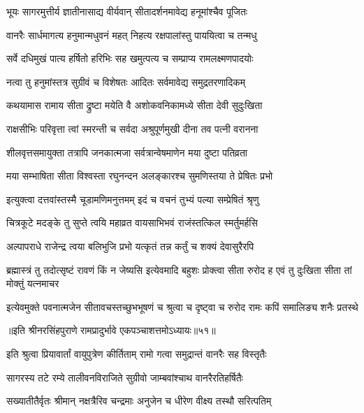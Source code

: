 \twolineshloka
{भूयः सागरमुत्तीर्य ज्ञातीनासाद्य वीर्यवान्}
{सीतादर्शनमावेद्य हनूमांश्चैव पूजितः} %

\twolineshloka
{वानरैः सार्धमागत्य हनुमान्मधुवनं महत्}
{निहत्य रक्षपालांस्तु पाययित्वा च तन्मधु} %

\twolineshloka
{सर्वे दधिमुखं पात्य हर्षितो हरिभिः सह}
{खमुत्पत्य च सम्प्राप्य रामलक्ष्मणपादयोः} %

\twolineshloka
{नत्वा तु हनुमांस्तत्र सुग्रीवं च विशेषतः}
{आदितः सर्वमावेद्य समुद्रतरणादिकम्} %

\twolineshloka
{कथयामास रामाय सीता द्रुष्टा मयेति वै}
{अशोकवनिकामध्ये सीता देवी सुदुःखिता} %

\twolineshloka
{राक्षसीभिः परिवृत्ता त्वां स्मरन्ती च सर्वदा}
{अश्रुपूर्णमुखी दीना तव पत्नी वरानना} %

\twolineshloka
{शीलवृत्तसमायुक्ता तत्रापि जनकात्मजा}
{सर्वत्रान्वेषमाणेन मया दुष्टा पतिव्रता} %

\twolineshloka
{मया सम्भाषिता सीता विश्वस्ता रघुनन्दन}
{अलङ्कारश्च सुमणिस्तया ते प्रेषितः प्रभो} %

\twolineshloka
{इत्युक्त्वा दत्तवांस्तस्मै चूडामणिमनुत्तमम्}
{इदं च वचनं तुभ्यं पल्या सम्प्रेषितं श्रृणु} %

\twolineshloka
{चित्रकूटे मदङ्के तु सुप्ते त्वयि महाव्रत}
{वायसाभिभवं राजंस्तत्किल स्मर्तुमर्हसि} %

\twolineshloka
{अल्पापराधे राजेन्द्र त्वया बलिभुजि प्रभो}
{यत्कृतं तन्न कर्तुं च शक्यं देवासुरैरपि} %

\threelineshloka
{ब्रह्मास्त्रं तु तदोत्सृष्टं रावणं किं न जेष्यसि}
{इत्येवमादि बहुशः प्रोक्त्वा सीता रुरोद ह}
{एवं तु दुःखिता सीता तां मोक्तुं यत्नमाचर} %

\fourlineindentedshloka
{इत्येवमुक्ते पवनात्मजेन}
{सीतावचस्तच्छुभभूषणं च}
{श्रुत्वा च दृष्ट्वा च रुरोद रामः}
{कपिं समालिङ्य शनैः प्रतस्थे} %

॥इति श्रीनरसिंहपुराणे रामप्रादुर्भावे एकपञ्चाशत्तमोऽध्यायः॥५१॥



\twolineshloka
{इति श्रुत्वा प्रियावार्तां वायुपुत्रेण कीर्तिताम्}
{रामो गत्वा समुद्रान्तं वानरैः सह विस्तृतैः} %

\twolineshloka
{सागरस्य तटे रम्ये तालीवनविराजिते}
{सुग्रीवो जाम्बवांश्चाथ वानरैरतिहर्षितैः} %

\twolineshloka
{सख्यातीतैर्वृतः श्रीमान् नक्षत्रैरिव चन्द्रमाः}
{अनुजेन च धीरेण वीक्ष्य तस्थौ सरित्पतिम्} %

